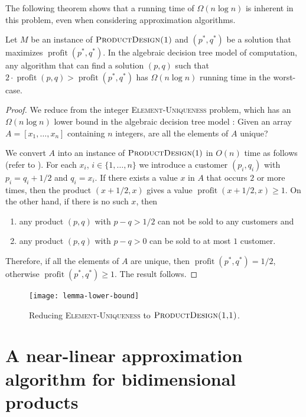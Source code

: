 \documentclass{llncs}
\newcommand{\val}{\operatorname{profit}}
\begin{document}
The following theorem shows that a running time of $\Omega(n\log n)$
is inherent in this problem, even when considering approximation
algorithms.

\begin{thm}
  Let $M$ be an instance of $\textsc{ProductDesign(1)}$ and $(p^*,q^*)$
  be a solution that maximizes $\val(p^*,q^*)$.  In the algebraic decision
  tree model of computation, any algorithm that can find a solution
  $(p,q)$ such that $2\cdot\val(p,q) > \val(p^*,q^*)$ has $\Omega(n\log n)$
  running time in the worst-case.
\end{thm}

\begin{proof}
  We reduce from the integer \textsc{Element-Uniqueness} problem, which
  has an $\Omega(n\log n)$ lower bound in the algebraic decision tree
  model \cite{y91}: Given an array $A=[x_1,\ldots,x_n]$ containing
  $n$ integers, are all the elements of $A$ unique?

  We convert $A$ into an instance of $\textsc{ProductDesign}(1)$ in
  $O(n)$ time as follows (refer to ).  For each
  $x_i$, $i\in\{1,\ldots,n\}$ we introduce a customer $(p_i,q_i)$ with
  $p_i=q_i+1/2$ and $q_i=x_i$.  If there exists a value $x$ in $A$ that
  occurs $2$ or more times, then the product $(x+1/2,x)$ gives a value
  $\val(x+1/2,x) \ge 1$.  On the other hand, if there is no such $x$,
  then 
  \begin{enumerate} 
    \item any product $(p,q)$ with $p-q>1/2$ can not be sold to any
    customers and
    \item any product $(p,q)$ with $p-q>0$ can be sold to at most $1$
    customer.
  \end{enumerate} 
  Therefore, if all the elements of $A$ are unique, then $\val(p^*,q^*)
  = 1/2$, otherwise $\val(p^*,q^*) \ge 1$.  The result follows.
\end{proof}

\begin{figure}
  \begin{center}
    \texttt{[image: lemma-lower-bound]}
  \end{center}
  \caption{Reducing \textsc{Element-Uniqueness} to
           $\textsc{ProductDesign(1,1)}$.}
\end{figure}

\section{A near-linear approximation algorithm for bidimensional products}
\end{document}
